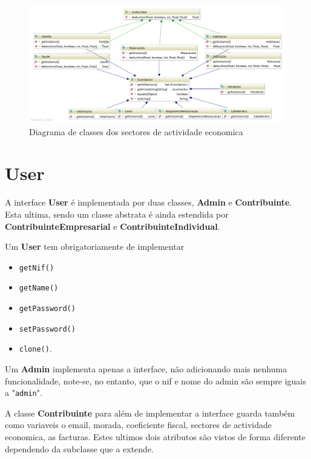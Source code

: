 \documentclass[12pt,a4paper]{report}
\begin{document}
    \begin{figure}[h]
        \centering
        \includegraphics[width=\textwidth]{./images/econSectors.png}
        \caption{Diagrama de classes dos sectores de actividade economica}
        \label{fig:sectors}
    \end{figure}

\pagebreak

    \section{User}
    A interface \textbf{User} é implementada por duas classes, \textbf{Admin} e
    \textbf{Contribuinte}. Esta ultima, sendo um classe abstrata é ainda
    estendida por \textbf{ContribuinteEmpresarial} e
    \textbf{ContribuinteIndividual}.

    Um \textbf{User} tem obrigatoriamente de implementar
    \begin{multicols}{3}
    \begin{itemize}
        \item \texttt{getNif()}
        \item \texttt{getName()}
        \item \texttt{getPassword()}
        \item \texttt{setPassword()}
        \item \texttt{clone()}.
    \end{itemize}
    \end{multicols}
    Um \textbf{Admin} implementa apenas a interface, não adicionando mais
    nenhuma funcionalidade, note-se, no entanto, que o nif e nome do admin são
    sempre iguais a "\texttt{admin}".

    A classe \textbf{Contribuinte} para além de implementar a interface
    guarda também como variaveis o email, morada, coeficiente fiscal, sectores
    de actividade economica, as facturas. Estes ultimos dois atributos são
    vistos de forma diferente dependendo da subclasse que a extende.
\end{document}
